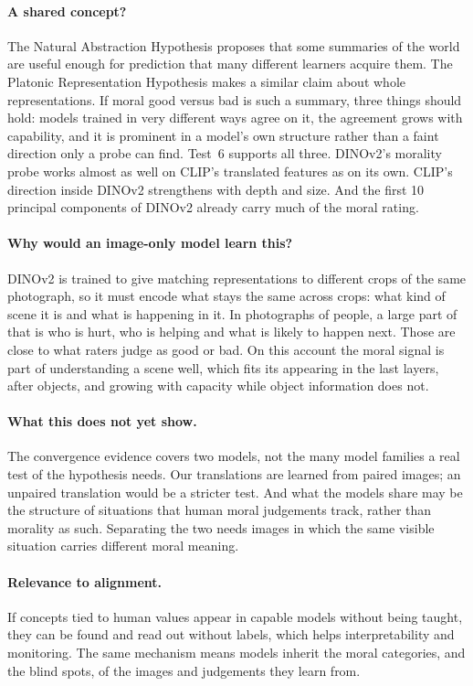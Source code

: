 \documentclass[11pt]{article}
\begin{document}
\paragraph{A shared concept?} The Natural Abstraction Hypothesis \cite{wentworth2021} proposes that some summaries of the world are useful enough for prediction that many different learners acquire them. The Platonic Representation Hypothesis \cite{huh2024} makes a similar claim about whole representations. If moral good versus bad is such a summary, three things should hold: models trained in very different ways agree on it, the agreement grows with capability, and it is prominent in a model's own structure rather than a faint direction only a probe can find. Test~6 supports all three. DINOv2's morality probe works almost as well on CLIP's translated features as on its own. CLIP's direction inside DINOv2 strengthens with depth and size. And the first 10 principal components of DINOv2 already carry much of the moral rating.

\paragraph{Why would an image-only model learn this?} DINOv2 is trained to give matching representations to different crops of the same photograph, so it must encode what stays the same across crops: what kind of scene it is and what is happening in it. In photographs of people, a large part of that is who is hurt, who is helping and what is likely to happen next. Those are close to what raters judge as good or bad. On this account the moral signal is part of understanding a scene well, which fits its appearing in the last layers, after objects, and growing with capacity while object information does not.

\paragraph{What this does not yet show.} The convergence evidence covers two models, not the many model families a real test of the hypothesis needs. Our translations are learned from paired images; an unpaired translation \cite{jha2025,tasker2026} would be a stricter test. And what the models share may be the structure of situations that human moral judgements track, rather than morality as such. Separating the two needs images in which the same visible situation carries different moral meaning.

\paragraph{Relevance to alignment.} If concepts tied to human values appear in capable models without being taught, they can be found and read out without labels, which helps interpretability and monitoring. The same mechanism means models inherit the moral categories, and the blind spots, of the images and judgements they learn from.
\end{document}
